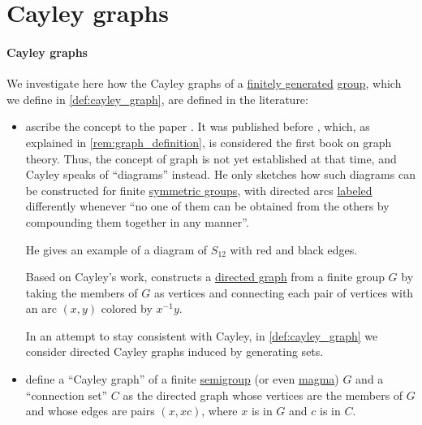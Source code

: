 \section{Cayley graphs}\label{sec:cayley_graphs}

\paragraph{Cayley graphs}

\begin{remark}\label{rem:cayley_graph_overview}
  We investigate here how the Cayley graphs of a \hyperref[def:group_presentation]{finitely generated} \hyperref[def:group]{group}, which we define in \cref{def:cayley_graph}, are defined in the literature:
  \begin{itemize}
    \item \Textcite[226]{Knauer2019AlgebraicGraphTheory} ascribe the concept to the paper \cite[1]{Cayley1878Graphs}. It was published before \cite{König1986Graphentheorie}, which, as explained in \cref{rem:graph_definition}, is considered the first book on graph theory. Thus, the concept of graph is not yet established at that time, and Cayley speaks of \enquote{diagrams} instead. He only sketches how such diagrams can be constructed for finite \hyperref[def:symmetric_group]{symmetric groups}, with directed arcs \hyperref[def:labeled_set]{labeled} differently whenever \enquote{no one of them can be obtained from the others by compounding them together in any manner}.

    He gives an example of a diagram of \( S_{12} \) with red and black edges.

    Based on Cayley's work, \textcite[156]{König1990GraphTheory} constructs a \hyperref[def:directed_graph]{directed graph} from a finite group \( G \) by taking the members of \( G \) as vertices and connecting each pair of vertices with an arc \( (x, y) \) colored by \( x^{-1} y \).

    In an attempt to stay consistent with Cayley, in \cref{def:cayley_graph} we consider directed Cayley graphs induced by generating sets.

    \item \Textcite[def. 7.3.1]{Knauer2019AlgebraicGraphTheory} define a \enquote{Cayley graph} of a finite \hyperref[def:semigroup]{semigroup} (or even \hyperref[rem:magma_terminology]{magma}) \( G \) and a \enquote{connection set} \( C \) as the directed graph whose vertices are the members of \( G \) and whose edges are pairs \( (x, xc) \), where \( x \) is in \( G \) and \( c \) is in \( C \).


\end{itemize}
\end{remark}
